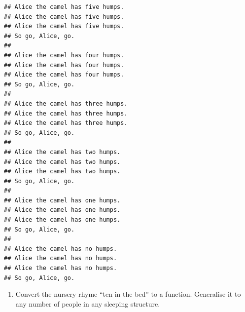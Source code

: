 \documentclass[]{book}
\newenvironment{Shaded}{\begin{snugshade}}{\end{snugshade}}
\newcommand{\CharTok}[1]{\textcolor[rgb]{0.31,0.60,0.02}{#1}}
\newcommand{\ControlFlowTok}[1]{\textcolor[rgb]{0.13,0.29,0.53}{\textbf{#1}}}
\newcommand{\DecValTok}[1]{\textcolor[rgb]{0.00,0.00,0.81}{#1}}
\newcommand{\KeywordTok}[1]{\textcolor[rgb]{0.13,0.29,0.53}{\textbf{#1}}}
\newcommand{\NormalTok}[1]{#1}
\newcommand{\OperatorTok}[1]{\textcolor[rgb]{0.81,0.36,0.00}{\textbf{#1}}}
\newcommand{\StringTok}[1]{\textcolor[rgb]{0.31,0.60,0.02}{#1}}
\providecommand{\tightlist}{%
  \setlength{\itemsep}{0pt}\setlength{\parskip}{0pt}}
\theoremstyle{definition}
\theoremstyle{definition}
\theoremstyle{definition}
\theoremstyle{remark}
\begin{document}
\begin{enumerate}
\begin{Shaded}
\end{Shaded}

\begin{verbatim}
## Alice the camel has five humps.
## Alice the camel has five humps.
## Alice the camel has five humps.
## So go, Alice, go.
## 
## Alice the camel has four humps.
## Alice the camel has four humps.
## Alice the camel has four humps.
## So go, Alice, go.
## 
## Alice the camel has three humps.
## Alice the camel has three humps.
## Alice the camel has three humps.
## So go, Alice, go.
## 
## Alice the camel has two humps.
## Alice the camel has two humps.
## Alice the camel has two humps.
## So go, Alice, go.
## 
## Alice the camel has one humps.
## Alice the camel has one humps.
## Alice the camel has one humps.
## So go, Alice, go.
## 
## Alice the camel has no humps.
## Alice the camel has no humps.
## Alice the camel has no humps.
## So go, Alice, go.
\end{verbatim}

  \begin{enumerate}
  \def\labelenumii{\arabic{enumii}.}
  \tightlist
  \item
    Convert the nursery rhyme ``ten in the bed'' to a function.
    Generalise it to any number of people in any sleeping structure.
  \end{enumerate}


\end{enumerate}
\end{document}
